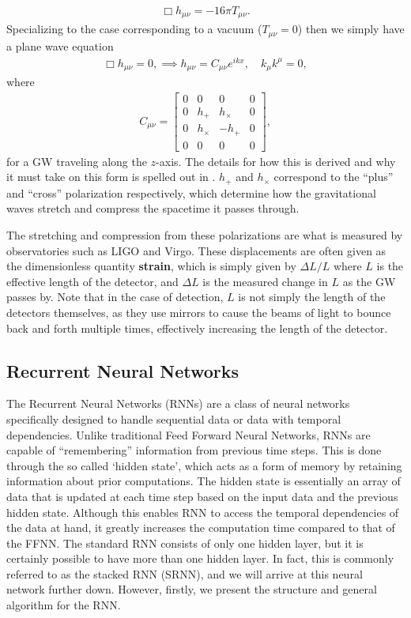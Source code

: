 \documentclass[%
reprint,
amsmath,amssymb,
aps,
]{revtex4-2}
\begin{document}
\begin{align}
	\Box h_{\mu\nu}=-16\pi T_{\mu\nu}.
\end{align}
Specializing to the case corresponding to a vacuum ($T_{\mu\nu}=0$) then we simply have a plane wave equation
\begin{align}
	\Box h_{\mu\nu}=0,\implies h_{\mu\nu}=C_{\mu\nu}e^{ikx},\quad k_\mu k^\mu=0,
\end{align}
where
\begin{align}
	C_{\mu\nu}=\begin{bmatrix}
		0&0&0&0\\
		0&h_+&h_\times&0\\
		0&h_\times&-h_+&0\\
		0&0&0&0
	\end{bmatrix},
\end{align}
for a GW traveling along the $z$-axis. The details for how this is derived and why it must take on this form is spelled out in \cite{Carroll}. $h_+$ and $h_\times$ correspond to the ``plus'' and ``cross'' polarization respectively, which determine how the gravitational waves stretch and compress the spacetime it passes through. 

The stretching and compression from these polarizations are what is measured by observatories such as LIGO and Virgo. These displacements are often given as the dimensionless quantity \textbf{strain}, which is simply given by $\Delta L/L$ where $L$ is the effective length of the detector, and $\Delta L$ is the measured change in $L$ as the GW passes by. Note that in the case of detection, $L$ is not simply the length of the detectors themselves, as they use mirrors to cause the beams of light to bounce back and forth multiple times, effectively increasing the length of the detector.


\subsection{Recurrent Neural Networks}
\label{sec:RNNs}
The Recurrent Neural Networks (RNNs) are a class of neural networks specifically designed to handle sequential data or data with temporal dependencies. Unlike traditional Feed Forward Neural Networks, RNNs are capable of ``remembering'' information from previous time steps. This is done through the so called `hidden state', which acts as a form of memory by retaining information about prior computations. The hidden state is essentially an array of data that is updated at each time step based on the input data and the previous hidden state. Although this enables RNN to access the temporal dependencies of the data at hand, it greatly increases the computation time compared to that of the FFNN. The standard RNN consists of only one hidden layer, but it is certainly possible to have more than one hidden layer. In fact, this is commonly referred to as the stacked RNN (SRNN), and we will arrive at this neural network further down. However, firstly, we present the structure and general algorithm for the RNN.
\end{document}

